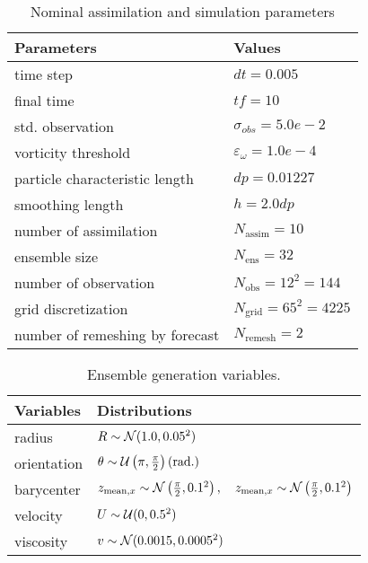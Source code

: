 \begin{table}[htbp]
    \centering
    \caption{Nominal assimilation and simulation parameters}
    \begin{tabular}{|l|l|}
        \hline
        Parameters                      & Values                          \\
        \hline
        time step                       & $dt = 0.005$                    \\
        final time                      & $tf =10$                        \\
        std. observation                & $\sigma_{obs} =  5.0e-2$        \\
        vorticity threshold             & $\varepsilon_{\omega} = 1.0e-4$ \\
        particle characteristic length  & $dp = 0.01227 $                 \\
        smoothing length                & $h = 2.0 dp$                    \\
        number of assimilation          & $N_{\text{assim}} = 10$         \\
        ensemble size                   & $N_{\text{ens}} = 32$           \\
        number of observation           & $N_{\text{obs}} = 12^2 = 144$   \\
        grid discretization             & $N_{\text{grid}} = 65^2 = 4225$ \\
        number of remeshing by forecast & $N_{\text{remesh}} =  2 $       \\
        \hline
    \end{tabular}
    \label{tab:simu_2d}
\end{table}
\begin{table}[htbp]
    \centering
    \caption{Ensemble generation variables.}
    \begin{tabular}{|l|l|}
        \hline
        Variables   & Distributions                                                                                                           \\
        \hline
        radius      & $R \sim \mathcal N(1.0, 0.05^2)$                                                                                               \\
        orientation & $\theta \sim \mathcal U\left(\pi, \frac\pi2 \right) (\text{rad.}) $                                                            \\
        barycenter  & $z_{\text{mean},x} \sim \mathcal N\left(\frac\pi2,0.1^2\right), \quad z_{\text{mean},x} \sim \mathcal N\left(\frac\pi2,0.1^2\right) $ \\
        velocity    & $U \sim \mathcal U(0, 0.5^2) $                                                                                                 \\
        viscosity   & $v \sim \mathcal N(0.0015, 0.0005^2)$                                                                                          \\
        \hline
    \end{tabular}
    \label{tab:ens_dipole}
\end{table}

\newpage